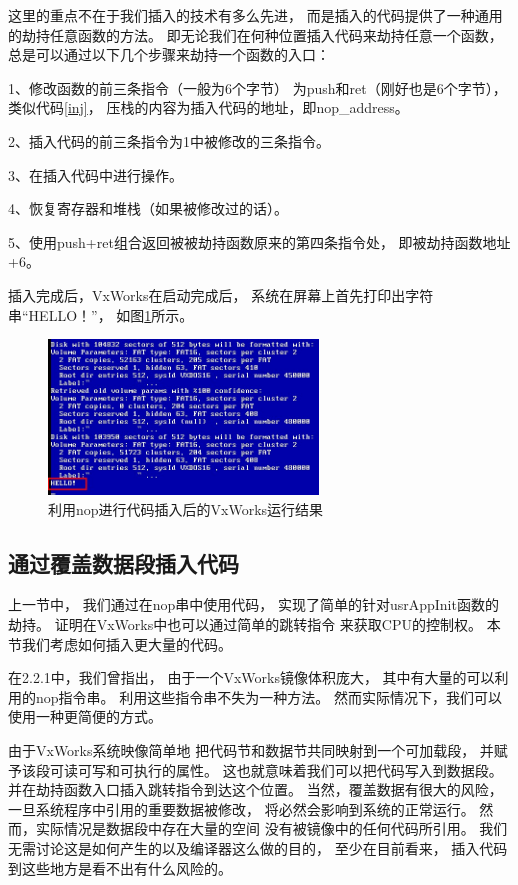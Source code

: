 这里的重点不在于我们插入的技术有多么先进，
而是插入的代码提供了一种通用的劫持任意函数的方法。
即无论我们在何种位置插入代码来劫持任意一个函数，
总是可以通过以下几个步骤来劫持一个函数的入口：

1、修改函数的前三条指令（一般为6个字节）
为push和ret（刚好也是6个字节），类似代码\ref{inj}，
压栈的内容为插入代码的地址，即nop\_address。

2、插入代码的前三条指令为1中被修改的三条指令。

3、在插入代码中进行操作。

4、恢复寄存器和堆栈（如果被修改过的话）。

5、使用push+ret组合返回被被劫持函数原来的第四条指令处，
即被劫持函数地址+6。

插入完成后，VxWorks在启动完成后，
系统在屏幕上首先打印出字符串“HELLO！”，
如图\ref{nophello}所示。

\begin{figure}[h!]
    \centering
    \includegraphics[width=0.64\textwidth]{figure/nophello.jpg}
    \caption{利用nop进行代码插入后的VxWorks运行结果}
    \label{nophello}
\end{figure}

\subsection{通过覆盖数据段插入代码}

上一节中，
我们通过在nop串中使用代码，
实现了简单的针对usrAppInit函数的劫持。
证明在VxWorks中也可以通过简单的跳转指令
来获取CPU的控制权。
本节我们考虑如何插入更大量的代码。

在2.2.1中，我们曾指出，
由于一个VxWorks镜像体积庞大，
其中有大量的可以利用的nop指令串。
利用这些指令串不失为一种方法。
然而实际情况下，我们可以使用一种更简便的方式。

由于VxWorks系统映像简单地
把代码节和数据节共同映射到一个可加载段，
并赋予该段可读可写和可执行的属性。
这也就意味着我们可以把代码写入到数据段。
并在劫持函数入口插入跳转指令到达这个位置。
当然，覆盖数据有很大的风险，
一旦系统程序中引用的重要数据被修改，
将必然会影响到系统的正常运行。
然而，实际情况是数据段中存在大量的空间
没有被镜像中的任何代码所引用。
我们无需讨论这是如何产生的以及编译器这么做的目的，
至少在目前看来，
插入代码到这些地方是看不出有什么风险的。

